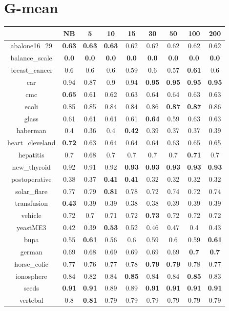 \documentclass{article}%
\begin{document}
%
\section*{G{-}mean}%
\begin{tabular}{c|cccccccc}%
\hline%
&NB&5&10&15&30&50&100&200\\%
\hline%
abalone16\_29&\textbf{0.63}&\textbf{0.63}&\textbf{0.63}&0.62&0.62&0.62&0.62&0.62\\%
\hline%
balance\_scale&\textbf{0.0}&\textbf{0.0}&\textbf{0.0}&\textbf{0.0}&\textbf{0.0}&\textbf{0.0}&\textbf{0.0}&\textbf{0.0}\\%
\hline%
breast\_cancer&0.6&0.6&0.6&0.59&0.6&0.57&\textbf{0.61}&0.6\\%
\hline%
car&0.94&0.87&0.9&0.94&\textbf{0.95}&\textbf{0.95}&\textbf{0.95}&\textbf{0.95}\\%
\hline%
cmc&\textbf{0.65}&0.61&0.62&0.63&0.64&0.64&0.63&0.63\\%
\hline%
ecoli&0.85&0.85&0.84&0.84&0.86&\textbf{0.87}&\textbf{0.87}&0.86\\%
\hline%
glass&0.61&0.61&0.61&0.61&\textbf{0.64}&0.59&0.63&0.63\\%
\hline%
haberman&0.4&0.36&0.4&\textbf{0.42}&0.39&0.37&0.37&0.39\\%
\hline%
heart\_cleveland&\textbf{0.72}&0.63&0.64&0.64&0.64&0.63&0.65&0.65\\%
\hline%
hepatitis&0.7&0.68&0.7&0.7&0.7&0.7&\textbf{0.71}&0.7\\%
\hline%
new\_thyroid&0.92&0.91&0.92&\textbf{0.93}&\textbf{0.93}&\textbf{0.93}&\textbf{0.93}&\textbf{0.93}\\%
\hline%
postoperative&0.38&0.37&\textbf{0.41}&\textbf{0.41}&0.32&0.32&0.32&0.32\\%
\hline%
solar\_flare&0.77&0.79&\textbf{0.81}&0.78&0.72&0.74&0.72&0.74\\%
\hline%
transfusion&\textbf{0.43}&0.39&0.39&0.38&0.38&0.39&0.39&0.39\\%
\hline%
vehicle&0.72&0.7&0.71&0.72&\textbf{0.73}&0.72&0.72&0.72\\%
\hline%
yeastME3&0.42&0.39&\textbf{0.53}&0.52&0.46&0.47&0.4&0.43\\%
\hline%
bupa&0.55&\textbf{0.61}&0.56&0.6&0.59&0.6&0.59&\textbf{0.61}\\%
\hline%
german&0.69&0.68&0.69&0.69&0.69&0.69&\textbf{0.7}&\textbf{0.7}\\%
\hline%
horse\_colic&0.77&0.76&0.77&0.78&\textbf{0.79}&\textbf{0.79}&0.78&0.77\\%
\hline%
ionosphere&0.84&0.82&0.84&\textbf{0.85}&0.84&0.84&\textbf{0.85}&0.83\\%
\hline%
seeds&\textbf{0.91}&\textbf{0.91}&0.89&0.89&\textbf{0.91}&\textbf{0.91}&\textbf{0.91}&\textbf{0.91}\\%
\hline%
vertebal&0.8&\textbf{0.81}&0.79&0.79&0.79&0.79&0.79&0.79\\%
\hline%
\end{tabular}

%
\end{document}
